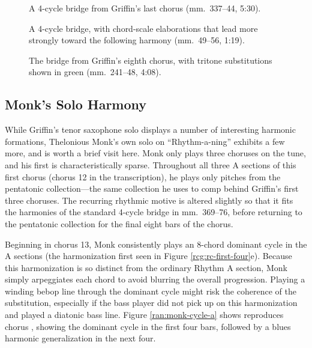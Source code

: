 \begin{figure}[tbp]
  \caption[A 4-cycle bridge from Griffin's last chorus.]{%
    A 4-cycle bridge from Griffin's last chorus (mm.~337--44, 5:30).}
  \label{ran:jg-standard-bridge}
\end{figure}

\begin{figure}[tbp]
  \caption[A 4-cycle bridge, with chord-scale elaborations that lead
  more strongly toward the following harmony.]{%
    A 4-cycle bridge, with chord-scale elaborations that lead more
    strongly toward the following harmony (mm.~49--56, 1:19).}
  \label{ran:jg-bridge-altered}
\end{figure}

\begin{figure}[tbp]
  \caption[The bridge from Griffin's eighth chorus, with tritone
  substitutions.]{%
    The bridge from Griffin's eighth chorus, with tritone substitutions shown
    in green (mm.~241--48, 4:08).}
  \label{ran:jg-bridge-tritones}
\end{figure}

\FloatBarrier
\subsection{Monk’s Solo Harmony}

While Griffin's tenor saxophone solo displays a number of interesting harmonic
formations, Thelonious Monk's own solo on ``Rhythm-a-ning'' exhibits a few
more, and is worth a brief visit here. Monk only plays three choruses on the
tune, and his first is characteristically sparse. Throughout all three A
sections of this first chorus (chorus 12 in the transcription), he plays only
pitches from the \Bflat pentatonic collection---the same collection he uses to
comp behind Griffin's first three choruses. The recurring rhythmic
motive is altered slightly so that it fits the harmonies of the standard
4-cycle bridge in mm.~369--76, before returning to the \Bflat pentatonic
collection for the final eight bars of the chorus.

Beginning in chorus 13, Monk consistently plays an 8-chord dominant cycle in
the A sections (the harmonization first seen in Figure
\ref{rcg:rc-first-four}e). Because this harmonization is so distinct from the
ordinary Rhythm A section, Monk simply arpeggiates each chord to avoid
blurring the overall progression. Playing a winding bebop line through the
dominant cycle might risk the coherence of the substitution, especially if the
bass player did not pick up on this harmonization and played a \Bflat diatonic
bass line. Figure \ref{ran:monk-cycle-a} shows reproduces chorus
, showing the dominant cycle in the first four bars, followed by a
\Bflat blues harmonic generalization in the next four.

